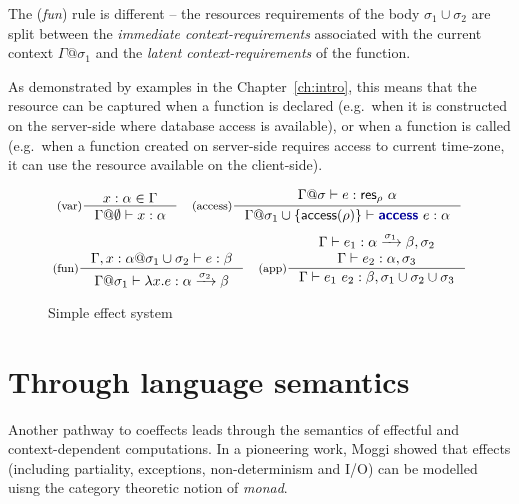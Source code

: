 The (\emph{fun}) rule is different -- the resources requirements of the body $\sigma_1 \cup \sigma_2$
are split between the \emph{immediate context-requirements} associated with the current context 
$\Gamma @ \sigma_1$ and the \emph{latent context-requirements} of the function.

As demonstrated by examples in the Chapter~\ref{ch:intro}, this means that the resource
can be captured when a function is declared (e.g.~when it is constructed on the server-side
where database access is available), or when a function is called (e.g.~when a function created
on server-side requires access to current time-zone, it can use the resource available on the
client-side).


\begin{figure}[t]
\begin{equation*}
\inference[(var)]
  {x:\alpha \in \Gamma }
  {\Gamma @ \emptyset \vdash x : \alpha }
\quad
\inference[(access)]
  { \Gamma @ \sigma \vdash e : \ident{res}_\rho~\alpha }
  {\Gamma @ \sigma_1 \cup \{\ident{access}(\rho)\} \vdash \kvd{access}~e : \alpha }
\end{equation*}
\begin{equation*}
\inference[(fun)]
  {\Gamma, x:\alpha @ \sigma_1 \cup \sigma_2 \vdash e : \beta }
  {\Gamma @ \sigma_1 \vdash \lambda x.e : \alpha \xrightarrow{\sigma_2} \beta}
\quad  
\inference[(app)]
  {\Gamma \vdash e_1 : \alpha \xrightarrow{\sigma_1} \beta, \sigma_2 \\
   \Gamma \vdash e_2 : \alpha, \sigma_3 }
  {\Gamma \vdash e_1~e_2 : \beta, \sigma_1 \cup \sigma_2 \cup \sigma_3 }
\end{equation*}

\caption{Simple effect system}
\label{fig:path-coeff}
\end{figure}


\section{Through language semantics}
\label{sec:path-sem}

Another pathway to coeffects leads through the semantics of effectful and context-dependent 
computations. In a pioneering work, Moggi \cite{monad-notions} showed that effects (including
partiality, exceptions, non-determinism and I/O) can be modelled uisng the category theoretic
notion of \emph{monad}.

